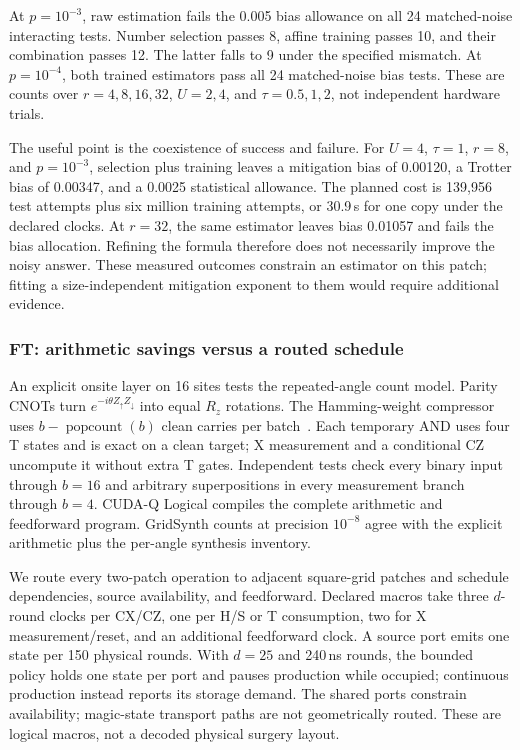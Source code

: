 \documentclass[11pt]{article}
\begin{document}
At $p=10^{-3}$, raw estimation fails the 0.005 bias allowance on all
24 matched-noise interacting tests. Number selection passes 8, affine
training passes 10, and their combination passes 12. The latter falls to
9 under the specified mismatch. At $p=10^{-4}$, both trained estimators
pass all 24 matched-noise bias tests. These are counts over $r=4,8,16,32$,
$U=2,4$, and $\tau=0.5,1,2$, not independent hardware trials.

The useful point is the coexistence of success and failure. For $U=4$,
$\tau=1$, $r=8$, and $p=10^{-3}$, selection plus training leaves a
mitigation bias of 0.00120, a Trotter bias of 0.00347, and a 0.0025
statistical allowance. The planned cost is 139,956 test attempts plus
six million training attempts, or 30.9\,s for one copy under the declared
clocks. At $r=32$, the same estimator leaves bias 0.01057 and fails the
bias allocation. Refining the formula therefore does not necessarily
improve the noisy answer. These measured outcomes constrain an estimator
on this patch; fitting a size-independent mitigation exponent to them
would require additional evidence.

\subsubsection{FT: arithmetic savings versus a routed schedule}
An explicit onsite layer on 16 sites tests the repeated-angle count model.
Parity CNOTs turn $e^{-i\theta Z_\uparrow Z_\downarrow}$ into equal $R_z$
rotations. The Hamming-weight compressor uses $b-\operatorname{popcount}(b)$
clean carries per batch~\cite{campbell}. Each temporary AND uses four T
states and is exact on a clean target; X measurement and a conditional CZ
uncompute it without extra T gates. Independent tests check every binary
input through $b=16$ and arbitrary superpositions in every measurement
branch through $b=4$. CUDA-Q Logical compiles the complete arithmetic and
feedforward program. GridSynth counts at precision $10^{-8}$ agree with
the explicit arithmetic plus the per-angle synthesis inventory.

We route every two-patch operation to adjacent square-grid patches and
schedule dependencies, source availability, and feedforward. Declared
macros take three $d$-round clocks per CX/CZ, one per H/S or T consumption,
two for X measurement/reset, and an additional feedforward clock. A source
port emits one state per 150 physical rounds. With $d=25$ and 240\,ns
rounds, the bounded policy holds one state per port and pauses production
while occupied; continuous production instead reports its storage demand.
The shared ports constrain availability; magic-state transport paths are not
geometrically routed. These are logical macros, not a decoded physical
surgery layout.
\end{document}
